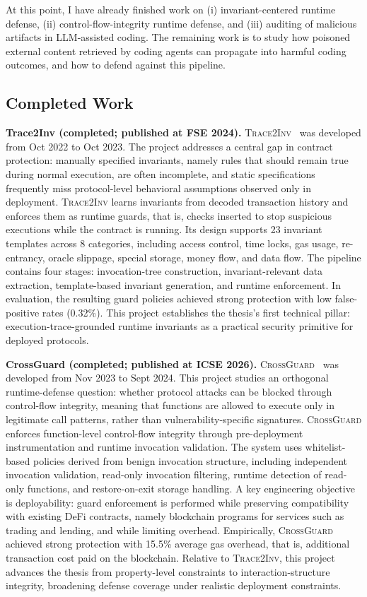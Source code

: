 \documentclass[11pt]{article}
\begin{document}
At this point, I have already finished work on
(i) invariant-centered runtime defense,
(ii) control-flow-integrity runtime defense, and
(iii) auditing of malicious artifacts in LLM-assisted coding.
The remaining work is to study how poisoned external content 
retrieved by coding agents 
can propagate into harmful coding outcomes, and how to 
defend against this pipeline.


\subsection{Completed Work}

\noindent \textbf{Trace2Inv (completed; published at FSE 2024).}
\textsc{Trace2Inv}~\cite{chen2024demystifying} was developed from Oct 2022 to Oct 2023.
The project addresses a central gap in contract protection: manually specified invariants, namely rules that should remain true during normal execution, are often incomplete,
and static specifications frequently miss protocol-level behavioral assumptions observed only in deployment.
\textsc{Trace2Inv} learns invariants from decoded transaction history and enforces them as runtime guards, that is, checks inserted to stop suspicious executions while the contract is running.
Its design supports 23 invariant templates across 8 categories, including access control, time locks,
gas usage, re-entrancy, oracle slippage, special storage, money flow, and data flow.
The pipeline contains four stages: invocation-tree construction, invariant-relevant data extraction,
template-based invariant generation, and runtime enforcement.
In evaluation, the resulting guard policies achieved strong protection with low false-positive rates (0.32\%).
This project establishes the thesis's first technical pillar: execution-trace-grounded runtime invariants
as a practical security primitive for deployed protocols.

\noindent \textbf{CrossGuard (completed; published at ICSE 2026).}
\textsc{CrossGuard}~\cite{chen2025secure} was developed from Nov 2023 to Sept 2024.
This project studies an orthogonal runtime-defense question: whether protocol attacks can be blocked
through control-flow integrity, meaning that functions are allowed to execute only in legitimate call patterns, rather than vulnerability-specific signatures.
\textsc{CrossGuard} enforces function-level control-flow integrity through pre-deployment instrumentation
and runtime invocation validation.
The system uses whitelist-based policies derived from benign invocation structure,
including independent invocation validation, read-only invocation filtering,
runtime detection of read-only functions, and restore-on-exit storage handling.
A key engineering objective is deployability: guard enforcement is performed while preserving compatibility
with existing DeFi contracts, namely blockchain programs for services such as trading and lending, and while limiting overhead.
Empirically, \textsc{CrossGuard} achieved strong protection with 15.5\% average gas overhead, that is, additional transaction cost paid on the blockchain.
Relative to \textsc{Trace2Inv}, this project advances the thesis from property-level constraints
to interaction-structure integrity, broadening defense coverage under realistic deployment constraints.
\end{document}

